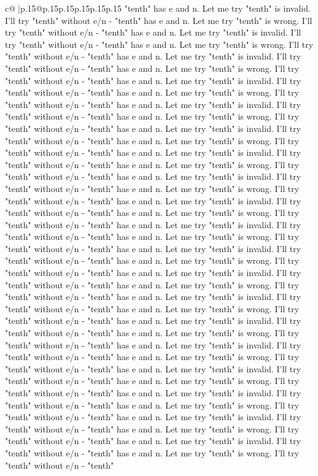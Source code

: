 \documentclass{article}
\begin{document}
{\begin{supertabular}{c@{$\;$}|p{.15\linewidth}@{}p{.15\linewidth}p{.15\linewidth}p{.15\linewidth}p{.15\linewidth}p{.15\linewidth}}
{{{"tenth" has e and n. Let me try "tenth" is invalid. I'll try "tenth" without e/n {-} "tenth" has e and n. Let me try "tenth" is wrong. I'll try "tenth" without e/n {-} "tenth" has e and n. Let me try "tenth" is invalid. I'll try "tenth" without e/n {-} "tenth" has e and n. Let me try "tenth" is wrong. I'll try "tenth" without e/n {-} "tenth" has e and n. Let me try "tenth" is invalid. I'll try "tenth" without e/n {-} "tenth" has e and n. Let me try "tenth" is wrong. I'll try "tenth" without e/n {-} "tenth" has e and n. Let me try "tenth" is invalid. I'll try "tenth" without e/n {-} "tenth" has e and n. Let me try "tenth" is wrong. I'll try "tenth" without e/n {-} "tenth" has e and n. Let me try "tenth" is invalid. I'll try "tenth" without e/n {-} "tenth" has e and n. Let me try "tenth" is wrong. I'll try "tenth" without e/n {-} "tenth" has e and n. Let me try "tenth" is invalid. I'll try "tenth" without e/n {-} "tenth" has e and n. Let me try "tenth" is wrong. I'll try "tenth" without e/n {-} "tenth" has e and n. Let me try "tenth" is invalid. I'll try "tenth" without e/n {-} "tenth" has e and n. Let me try "tenth" is wrong. I'll try "tenth" without e/n {-} "tenth" has e and n. Let me try "tenth" is invalid. I'll try "tenth" without e/n {-} "tenth" has e and n. Let me try "tenth" is wrong. I'll try "tenth" without e/n {-} "tenth" has e and n. Let me try "tenth" is invalid. I'll try "tenth" without e/n {-} "tenth" has e and n. Let me try "tenth" is wrong. I'll try "tenth" without e/n {-} "tenth" has e and n. Let me try "tenth" is invalid. I'll try "tenth" without e/n {-} "tenth" has e and n. Let me try "tenth" is wrong. I'll try "tenth" without e/n {-} "tenth" has e and n. Let me try "tenth" is invalid. I'll try "tenth" without e/n {-} "tenth" has e and n. Let me try "tenth" is wrong. I'll try "tenth" without e/n {-} "tenth" has e and n. Let me try "tenth" is invalid. I'll try "tenth" without e/n {-} "tenth" has e and n. Let me try "tenth" is wrong. I'll try "tenth" without e/n {-} "tenth" has e and n. Let me try "tenth" is invalid. I'll try "tenth" without e/n {-} "tenth" has e and n. Let me try "tenth" is wrong. I'll try "tenth" without e/n {-} "tenth" has e and n. Let me try "tenth" is invalid. I'll try "tenth" without e/n {-} "tenth" has e and n. Let me try "tenth" is wrong. I'll try "tenth" without e/n {-} "tenth" has e and n. Let me try "tenth" is invalid. I'll try "tenth" without e/n {-} "tenth" has e and n. Let me try "tenth" is wrong. I'll try "tenth" without e/n {-} "tenth" has e and n. Let me try "tenth" is invalid. I'll try "tenth" without e/n {-} "tenth" has e and n. Let me try "tenth" is wrong. I'll try "tenth" without e/n {-} "tenth" has e and n. Let me try "tenth" is invalid. I'll try "tenth" without e/n {-} "tenth" has e and n. Let me try "tenth" is wrong. I'll try "tenth" without e/n {-} "tenth" has e and n. Let me try "tenth" is invalid. I'll try "tenth" without e/n {-} "tenth" has e and n. Let me try "tenth" is wrong. I'll try "tenth" without e/n {-} "tenth" has e and n. Let me try "tenth" is invalid. I'll try "tenth" without e/n {-} "tenth" has e and n. Let me try "tenth" is wrong. I'll try "tenth" without e/n {-} "tenth" }}}
\end{supertabular}}
\end{document}
